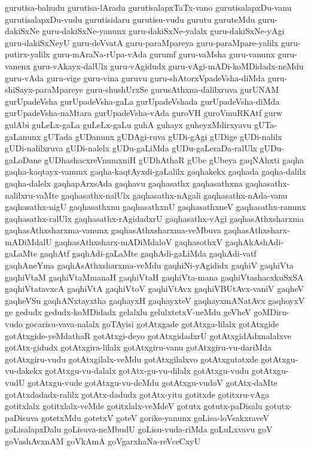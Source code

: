 {gurutisa-bahudu
gurutisa-lAradu
gurutisalapxTaTx-vano
gurutisalapxDu-vanu
gurutisalapxDu-vudu
gurutisidaru
gurutisu-vudu
gurutu
guruteMdu
guru-dakiSxNe
guru-dakiSxNe-yanunx
guru-dakiSxNe-yalalx
guru-dakiSxNe-yAgi
guru-dakiSxNeyU
guru-deVvatA
guru-paraMpareya
guru-paraMpare-yalilx
guru-putirx-yalilx
guru-mAraNa-rUpa-vAda
gurumf
guru-vaMsha
guru-vanunx
guru-vanenx
guru-vAkayx-dalUlx
guru-vAgidudx
guru-vAgi-mADi-koMDidadx-neMdu
guru-vAda
guru-vige
guru-vina
guruvu
guru-shAtorxVpadeVsha-diMda
guru-shiSayx-paraMpareye
guru-shushUrxSe
gurusAthxna-dalilxruva
gurUNAM
gurUpadeVsha
gurUpadeVsha-gaLa
gurUpadeVshada
gurUpadeVsha-diMda
gurUpadeVsha-naMtara
gurUpadeVsha-vAda
guroVH
guroVmuRKAtf
gurw
gulAbi
guLeLx-gaLa
guLeLx-gaLu
guhA
guhayx
guheyxMdirxyavu
gUTa-gaLanunx
gUTada
gUDanunx
gUDAgi-ruva
gUDi-gAgi
gUDige
gUDi-nalilx
gUDi-nalilxruva
gUDi-nalelx
gUDu-gaLiMda
gUDu-gaLeraDa-ralUlx
gUDu-gaLoDane
gUDhashacxreVnumxniH
gUDhAthaR
gUbe
gUbeya
gaqNAhxti
gaqha
gaqha-kaqtayx-vanunx
gaqha-kaqtAyxdi-gaLalilx
gaqhakekx
gaqhada
gaqha-dalilx
gaqha-dalelx
gaqhapArxsAda
gaqhavu
gaqhasathx
gaqhasathxna
gaqhasathx-nalilxru-vaMte
gaqhasathx-nalUlx
gaqhasathx-nAgali
gaqhasathx-nAda-vanu
gaqhasathx-nigU
gaqhasathxnu
gaqhasathxnU
gaqhasathxneV
gaqhasathx-ranunx
gaqhasathx-ralUlx
gaqhasathx-rAgidadxrU
gaqhasathx-vAgi
gaqhasAthxsharxma
gaqhasAthxsharxma-vanunx
gaqhasAthxsharxma-veMbuva
gaqhasAthxsharx-mADiMdalU
gaqhasAthxsharx-mADiMdaloV
gaqhasothxV
gaqhAkAshAdi-gaLaMte
gaqhAtf
gaqhAdi-gaLaMte
gaqhAdi-gaLiMda
gaqhAdi-vatf
gaqhAneYma
gaqhAsAthxsharxma-veMdu
gaqhiNi-yAgididx
gaqhiV
gaqhiVta
gaqhiVtaM
gaqhiVtaMmanaH
gaqhiVtaH
gaqhiVta-mana
gaqhiVtashacxkuSxSA
gaqhiVtatavxcA
gaqhiVtA
gaqhiVtoV
gaqhiVtAvx
gaqhiVBUtAvx-vaniV
gaqheV
gaqheVSu
gaqhANxtayxtha
gaqhayxH
gaqhayxteV
gaqhayxmANatAvx
gaqhoyxV
ge
gedudx
gedudx-koMDidadx
gelalxlu
gelulxtetxV-neMdu
geVheV
goMDiru-vudo
gocarisu-vava-nalalx
goTAyisi
gotAtxgade
gotAtxga-lilalx
gotAtxgide
gotAtxgide-yeMdathaR
gotAtxgi-deyo
gotAtxgidadxrU
gotAtxgidAdxnalalxve
gotAtx-gidudx
gotAtxgira-lilalx
gotAtxgiru-vanu
gotAtxgiru-vu-dariMda
gotAtxgiru-vudu
gotAtxgilalx-veMdu
gotAtxgilalxvo
gotAtxgutatxde
gotAtxgu-vu-dakekx
gotAtxgu-vu-dalalx
gotAtx-gu-vu-dilalx
gotAtxgu-vudu
gotAtxgu-vudU
gotAtxgu-vude
gotAtxgu-vu-deMdu
gotAtxgu-vudoV
gotAtx-daMte
gotAtxdadadx-ralilx
gotAtx-dadudx
gotAtx-yitu
gotitxde
gotitxru-vAga
gotitxlalx
gotitxlalx-veMde
gotitxlalx-veMdeV
gotutx
gotutx-paDisalu
gotutx-paDisuva
gotetxMdu
gotetxV
goteV
gorike-yanunx
goLisa-loVsakxraveV
goLisalapxDalu
goLisuva-neMbudU
goLisu-vuda-riMda
goLuLxvavu
goV
goVashAvxnAM
goVkAmA
goVgarxhaNa-reVceCxyU
}

